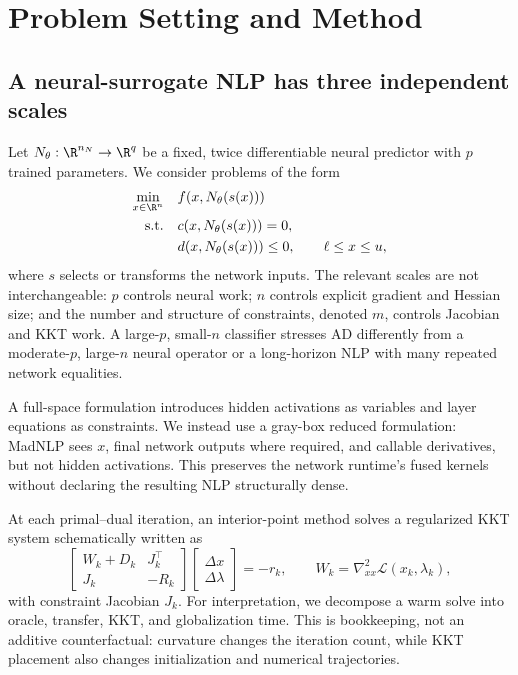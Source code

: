 \section{Problem Setting and Method}
\label{sec:method}

\subsection{A neural-surrogate NLP has three independent scales}

Let $N_{\theta}:\R^{n_N}\rightarrow\R^{q}$ be a fixed, twice
differentiable neural predictor with $p$ trained parameters.  We consider
problems of the form
\begin{equation}
\begin{aligned}
\min_{x\in\R^n}\quad & f(x,N_\theta(s(x))) \\
\text{s.t.}\quad & c(x,N_\theta(s(x)))=0, \\
& d(x,N_\theta(s(x)))\leq 0,\qquad \ell\leq x\leq u,
\end{aligned}
\label{eq:nlp}
\end{equation}
where $s$ selects or transforms the network inputs.  The relevant scales are
not interchangeable: $p$ controls neural work; $n$ controls explicit gradient
and Hessian size; and the number and structure of constraints, denoted $m$,
controls Jacobian and KKT work.  A large-$p$, small-$n$ classifier stresses AD
differently from a moderate-$p$, large-$n$ neural operator or a long-horizon
NLP with many repeated network equalities.

A full-space formulation introduces hidden activations as variables and layer
equations as constraints.  We instead use a gray-box reduced formulation:
MadNLP sees $x$, final network outputs where required, and callable derivatives,
but not hidden activations.  This preserves the network runtime's fused kernels
without declaring the resulting NLP structurally dense.

At each primal--dual iteration, an interior-point method solves a regularized
KKT system schematically written as
\begin{equation}
\begin{bmatrix}
W_k + D_k & J_k^\top \\
J_k       & -R_k
\end{bmatrix}
\begin{bmatrix}\Delta x\\\Delta\lambda\end{bmatrix}
=-r_k,
\qquad
W_k=\nabla_{xx}^2\mathcal{L}(x_k,\lambda_k),
\label{eq:kkt}
\end{equation}
with constraint Jacobian $J_k$.  For interpretation, we decompose a warm solve
into oracle, transfer, KKT, and globalization time.  This is bookkeeping, not
an additive counterfactual: curvature changes the iteration count, while KKT
placement also changes initialization and numerical trajectories.

